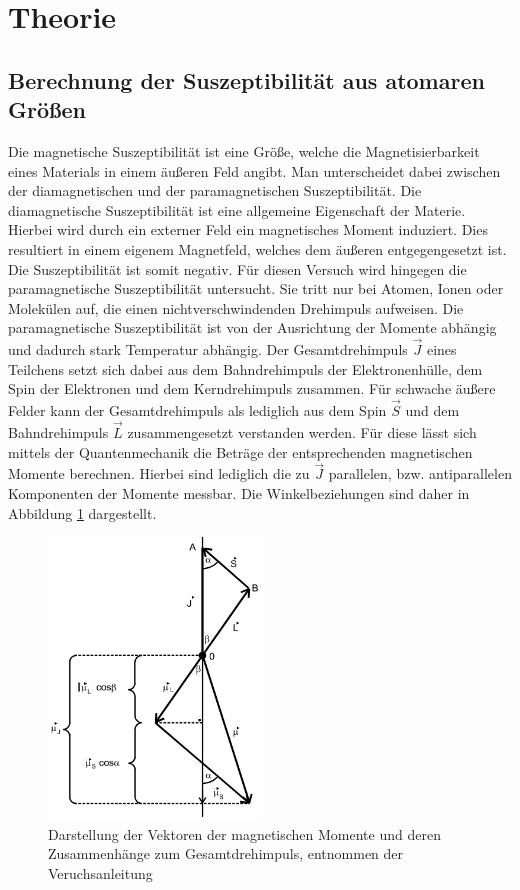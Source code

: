 \section{Theorie}
\label{sec:Theorie}

\subsection{Berechnung der Suszeptibilität aus atomaren Größen}
Die magnetische Suszeptibilität ist eine Größe, welche die Magnetisierbarkeit eines Materials in einem äußeren Feld angibt.
Man unterscheidet dabei zwischen der diamagnetischen und der paramagnetischen Suszeptibilität.
Die diamagnetische Suszeptibilität ist eine allgemeine Eigenschaft der Materie.
Hierbei wird durch ein externer Feld ein magnetisches Moment induziert.
Dies resultiert in einem eigenem Magnetfeld, welches dem äußeren entgegengesetzt ist.
Die Suszeptibilität ist somit negativ.
Für diesen Versuch wird hingegen die paramagnetische Suszeptibilität untersucht.
Sie tritt nur bei Atomen, Ionen oder Molekülen auf, die einen nichtverschwindenden Drehimpuls aufweisen.
Die paramagnetische Suszeptibilität ist von der Ausrichtung der Momente abhängig und dadurch stark Temperatur abhängig.
Der Gesamtdrehimpuls $\vec{J}$ eines Teilchens setzt sich dabei aus dem Bahndrehimpuls der Elektronenhülle, dem Spin der Elektronen und dem Kerndrehimpuls zusammen.
Für schwache äußere Felder kann der Gesamtdrehimpuls als lediglich aus dem Spin $\vec{S}$ und dem Bahndrehimpuls $\vec{L}$ zusammengesetzt verstanden werden.
Für diese lässt sich mittels der Quantenmechanik die Beträge der entsprechenden magnetischen Momente berechnen.
Hierbei sind lediglich die zu $\vec{J}$ parallelen, bzw. antiparallelen Komponenten der Momente messbar.
Die Winkelbeziehungen sind daher in Abbildung \ref{fig:Winkelbeziehungen} dargestellt.

\begin{figure}
  \centering
  \includegraphics[width=0.5\textwidth]{images/Winkelbeziehungen.png}
  \caption{Darstellung der Vektoren der magnetischen Momente und deren Zusammenhänge zum Gesamtdrehimpuls, entnommen der Veruchsanleitung\cite[174]{sample}}
  \label{fig:Winkelbeziehungen}
\end{figure}

